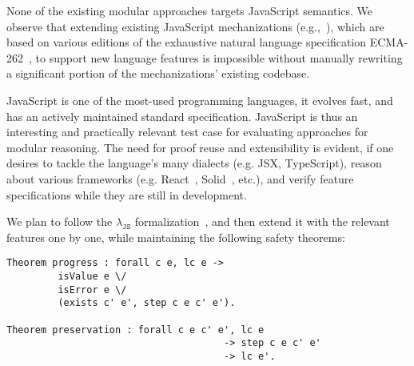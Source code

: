 \documentclass[sigplan,nonacm,review]{acmart}
\begin{document}

None of the existing modular approaches targets JavaScript semantics.
We observe that extending existing JavaScript mechanizations (e.g.,~\cite{guha2010essence,bodin2014trusted}), which are based on various editions of the exhaustive natural language specification ECMA-262~\cite{ECMA},
to support new language features
is impossible without manually rewriting a significant portion of the mechanizations' existing codebase.


JavaScript is one of the most-used programming languages, it evolves fast, and has an actively maintained standard specification. JavaScript is thus an interesting and practically relevant test case for evaluating approaches for modular reasoning. The need for proof reuse and extensibility is evident, if one desires to tackle the language's many dialects (e.g. JSX, TypeScript), reason about various frameworks (e.g. React~\cite{React}, Solid~\cite{Solid}, etc.), and verify feature specifications while they are still in development. 



We plan to follow the $\lambda_{\texttt{JS}}$ formalization~\cite{guha2010essence},
and then extend it with the relevant features one by one,
while maintaining the following safety theorems:

\begin{lstlisting}[numbers=none, language=Coq]
Theorem progress : forall c e, lc e -> 
         isValue e \/ 
         isError e \/ 
         (exists c' e', step c e c' e').

Theorem preservation : forall c e c' e', lc e
                                      -> step c e c' e'
                                      -> lc e'.
\end{lstlisting}
\end{document}
